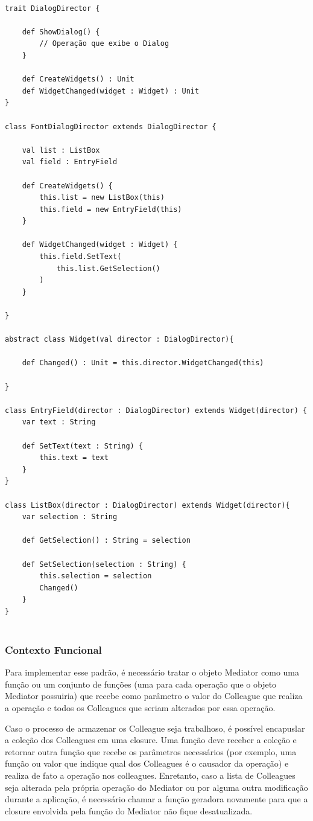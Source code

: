 \begin{lstlisting}[caption={Mediator Orientação a Objetos},label=oomediator]

trait DialogDirector {
    
    def ShowDialog() {
        // Operação que exibe o Dialog
    }

    def CreateWidgets() : Unit
    def WidgetChanged(widget : Widget) : Unit
}

class FontDialogDirector extends DialogDirector {
    
    val list : ListBox
    val field : EntryField
    
    def CreateWidgets() {
        this.list = new ListBox(this)
        this.field = new EntryField(this)
    }

    def WidgetChanged(widget : Widget) {
        this.field.SetText(
            this.list.GetSelection()
        )
    }

}

abstract class Widget(val director : DialogDirector){

    def Changed() : Unit = this.director.WidgetChanged(this)

}

class EntryField(director : DialogDirector) extends Widget(director) {
    var text : String

    def SetText(text : String) {
        this.text = text
    }
}

class ListBox(director : DialogDirector) extends Widget(director){
    var selection : String

    def GetSelection() : String = selection

    def SetSelection(selection : String) {
        this.selection = selection
        Changed()
    }
}
    
\end{lstlisting}

\subsubsection*{Contexto Funcional}

Para implementar esse padrão, é necessário tratar o objeto 
Mediator como uma função ou um conjunto de funções (uma para 
cada operação que o objeto Mediator possuiria) que recebe 
como parâmetro o valor do Colleague que realiza a operação 
e todos os Colleagues que seriam alterados por essa 
operação.

Caso o processo de armazenar os Colleague seja trabalhoso, 
é possível encapuslar a coleção dos Colleagues em uma 
closure. Uma função deve receber a coleção e retornar 
outra função que recebe os parâmetros necessários (por 
exemplo, uma função ou valor que indique qual dos Colleagues 
é o causador da operação) e realiza de fato a operação 
nos colleagues. Enretanto, caso a lista de Colleagues 
seja alterada pela própria operação do Mediator ou por 
alguma outra modificação durante a aplicação, é necessário 
chamar a função geradora novamente para que a closure 
envolvida pela função do Mediator não fique desatualizada.

